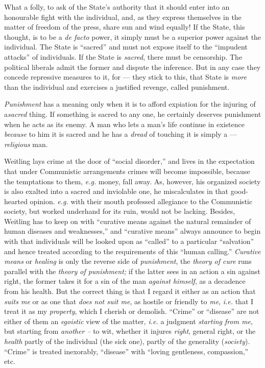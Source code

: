 What a folly, to ask of the State's authority that it should enter into an 
honourable fight with the individual, and, as they express themselves in the 
matter of freedom of the press, share sun and wind equally! If the State, this 
thought, is to be a \textit{de facto} power, it simply must be a superior 
power against the individual. The State is ``sacred'' and must not expose 
itself to the ``impudent attacks'' of individuals. If the State is 
\textit{sacred}, there must be censorship. The political liberals admit the 
former and dispute the inference. But in any case they concede repressive 
measures to it, for --- they stick to this, that State is \textit{more} than 
the individual and exercises a justified revenge, called punishment.

\textit{Punishment} has a meaning only when it is to afford expiation for the 
injuring of a\textit{sacred} thing. If something is sacred to any one, he 
certainly deserves punishment when he acts as its enemy. A man who lets a 
man's life continue in existence \textit{because} to him it is sacred and he 
has a \textit{dread} of touching it is simply a --- \textit{religious} man.

Weitling lays crime at the door of ``social disorder,'' and lives in the 
expectation that under Communistic arrangements crimes will become impossible, 
because the temptations to them, \textit{e.g.} money, fall away. As, however, 
his organized society is also exalted into a sacred and inviolable one, he 
miscalculates in that good-hearted opinion. \textit{e.g.} with their mouth 
professed allegiance to the Communistic society, but worked underhand for its 
ruin, would not be lacking. Besides, Weitling has to keep on with ``curative 
means against the natural remainder of human diseases and weaknesses,'' and 
``curative means'' always announce to begin with that individuals will be 
looked upon as ``called'' to a particular ``salvation'' and hence treated 
according to the requirements of this ``human calling.'' \textit{Curative 
means} or \textit{healing} is only the reverse side of \textit{punishment}, 
the \textit{theory of cure} runs parallel with the \textit{theory of 
punishment;} if the latter sees in an action a sin against right, the former 
takes it for a sin of the man \textit{against himself}, as a decadence from 
his health. But the correct thing is that I regard it either as an action that 
\textit{suits me} or as one that \textit{does not suit me}, as hostile or 
friendly to \textit{me}, \textit{i.e.} that I treat it as my 
\textit{property}, which I cherish or demolish. ``Crime'' or ``disease'' 
are not either of them an \textit{egoistic} view of the matter, \textit{i.e.} 
a judgment \textit{starting from me}, but starting from \textit{another --} to 
wit, whether it injures \textit{right}, general right, or the \textit{health} 
partly of the individual (the sick one), partly of the generality 
(\textit{society}). ``Crime'' is treated inexorably, ``disease'' with 
``loving gentleness, compassion,'' etc.

